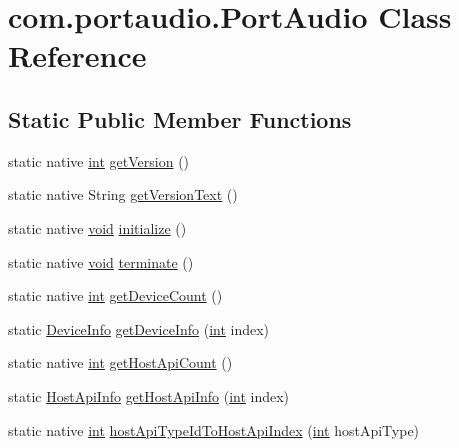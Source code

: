 \hypertarget{classcom_1_1portaudio_1_1_port_audio}{}\section{com.\+portaudio.\+Port\+Audio Class Reference}
\label{classcom_1_1portaudio_1_1_port_audio}
\subsection*{Static Public Member Functions}
\begin{DoxyCompactItemize}
\item 
static native \hyperlink{xmltok_8h_a5a0d4a5641ce434f1d23533f2b2e6653}{int} \hyperlink{classcom_1_1portaudio_1_1_port_audio_a472cdb12b5c715b463e9a0f9754e6794}{get\+Version} ()
\item 
static native String \hyperlink{classcom_1_1portaudio_1_1_port_audio_af0f4312152d15a594aaa978fa8f7bc33}{get\+Version\+Text} ()
\item 
static native \hyperlink{sound_8c_ae35f5844602719cf66324f4de2a658b3}{void} \hyperlink{classcom_1_1portaudio_1_1_port_audio_a056b212026d02c19607d81a4faf8a4b0}{initialize} ()
\item 
static native \hyperlink{sound_8c_ae35f5844602719cf66324f4de2a658b3}{void} \hyperlink{classcom_1_1portaudio_1_1_port_audio_a2d20afde68cdc2834850cda643717cfe}{terminate} ()
\item 
static native \hyperlink{xmltok_8h_a5a0d4a5641ce434f1d23533f2b2e6653}{int} \hyperlink{classcom_1_1portaudio_1_1_port_audio_a687ec58fa9debb2c9a15dc885b389537}{get\+Device\+Count} ()
\item 
static \hyperlink{classcom_1_1portaudio_1_1_device_info}{Device\+Info} \hyperlink{classcom_1_1portaudio_1_1_port_audio_a5a7313844e5ac030a8129c845f173130}{get\+Device\+Info} (\hyperlink{xmltok_8h_a5a0d4a5641ce434f1d23533f2b2e6653}{int} index)
\item 
static native \hyperlink{xmltok_8h_a5a0d4a5641ce434f1d23533f2b2e6653}{int} \hyperlink{classcom_1_1portaudio_1_1_port_audio_a5b8711db178f99c4980dee9b46ac810a}{get\+Host\+Api\+Count} ()
\item 
static \hyperlink{classcom_1_1portaudio_1_1_host_api_info}{Host\+Api\+Info} \hyperlink{classcom_1_1portaudio_1_1_port_audio_ad9feef9e0a5da56914633c2f2482543c}{get\+Host\+Api\+Info} (\hyperlink{xmltok_8h_a5a0d4a5641ce434f1d23533f2b2e6653}{int} index)
\item 
static native \hyperlink{xmltok_8h_a5a0d4a5641ce434f1d23533f2b2e6653}{int} \hyperlink{classcom_1_1portaudio_1_1_port_audio_a4ad822032493ff1144000f5673daf569}{host\+Api\+Type\+Id\+To\+Host\+Api\+Index} (\hyperlink{xmltok_8h_a5a0d4a5641ce434f1d23533f2b2e6653}{int} host\+Api\+Type)

\end{DoxyCompactItemize}
